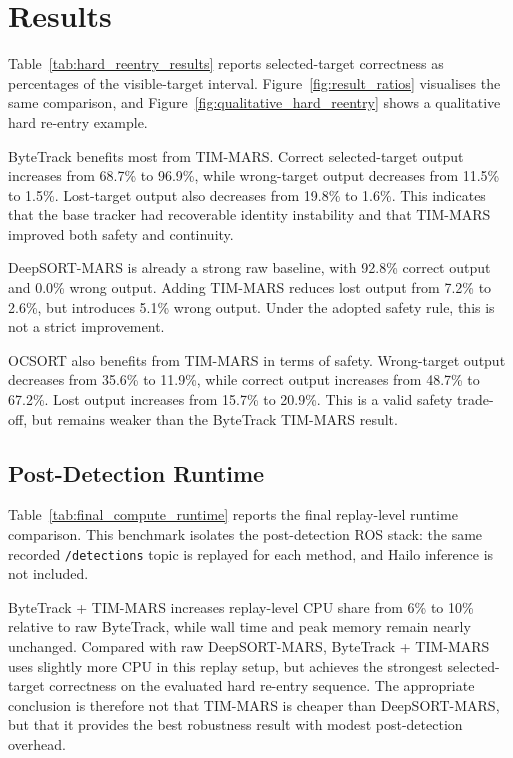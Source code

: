 \section{Results}

Table~\ref{tab:hard_reentry_results} reports selected-target correctness as percentages of the visible-target interval. Figure~\ref{fig:result_ratios} visualises the same comparison, and Figure~\ref{fig:qualitative_hard_reentry} shows a qualitative hard re-entry example.





ByteTrack benefits most from TIM-MARS. Correct selected-target output increases from 68.7\% to 96.9\%, while wrong-target output decreases from 11.5\% to 1.5\%. Lost-target output also decreases from 19.8\% to 1.6\%. This indicates that the base tracker had recoverable identity instability and that TIM-MARS improved both safety and continuity.

DeepSORT-MARS is already a strong raw baseline, with 92.8\% correct output and 0.0\% wrong output. Adding TIM-MARS reduces lost output from 7.2\% to 2.6\%, but introduces 5.1\% wrong output. Under the adopted safety rule, this is not a strict improvement.

OCSORT also benefits from TIM-MARS in terms of safety. Wrong-target output decreases from 35.6\% to 11.9\%, while correct output increases from 48.7\% to 67.2\%. Lost output increases from 15.7\% to 20.9\%. This is a valid safety trade-off, but remains weaker than the ByteTrack TIM-MARS result.

\subsection{Post-Detection Runtime}

Table~\ref{tab:final_compute_runtime} reports the final replay-level runtime comparison. This benchmark isolates the post-detection ROS stack: the same recorded \texttt{/detections} topic is replayed for each method, and Hailo inference is not included.



ByteTrack + TIM-MARS increases replay-level CPU share from 6\% to 10\% relative to raw ByteTrack, while wall time and peak memory remain nearly unchanged. Compared with raw DeepSORT-MARS, ByteTrack + TIM-MARS uses slightly more CPU in this replay setup, but achieves the strongest selected-target correctness on the evaluated hard re-entry sequence. The appropriate conclusion is therefore not that TIM-MARS is cheaper than DeepSORT-MARS, but that it provides the best robustness result with modest post-detection overhead.
